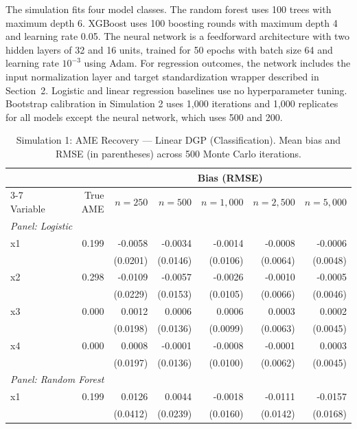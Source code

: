 \documentclass[conference]{IEEEtran}
\begin{document}
	The simulation fits four model classes. The random forest uses 100 trees with maximum depth 6. XGBoost uses 100 boosting rounds with maximum depth 4 and learning rate 0.05. The neural network is a feedforward architecture with two hidden layers of 32 and 16 units, trained for 50 epochs with batch size 64 and learning rate $10^{-3}$ using Adam. For regression outcomes, the network includes the input normalization layer and target standardization wrapper described in Section~2. Logistic and linear regression baselines use no hyperparameter tuning. Bootstrap calibration in Simulation 2 uses 1{,}000 iterations and 1{,}000 replicates for all models except the neural network, which uses 500 and 200.
	
	\begin{table}[htbp]
		\centering
		\small
		\begin{threeparttable}
			\caption{Simulation 1: AME Recovery --- Linear DGP (Classification). Mean bias and RMSE (in parentheses) across 500 Monte Carlo iterations.}
			\label{tab:sim1_classification_linear}
			\begin{tabular}{lrrrrrr}
				\toprule
				& & \multicolumn{5}{c}{Bias (RMSE)} \\
				\cmidrule(lr){3-7}
				Variable & True AME & $n=250$ & $n=500$ & $n=1,000$ & $n=2,500$ & $n=5,000$ \\
				\midrule
				\multicolumn{7}{l}{\textit{Panel: Logistic}} \\
				\quad x1 & 0.199 & -0.0058 & -0.0034 & -0.0014 & -0.0008 & -0.0006 \\
				&  & (0.0201) & (0.0146) & (0.0106) & (0.0064) & (0.0048) \\
				\quad x2 & 0.298 & -0.0109 & -0.0057 & -0.0026 & -0.0010 & -0.0005 \\
				&  & (0.0229) & (0.0153) & (0.0105) & (0.0066) & (0.0046) \\
				\quad x3 & 0.000 & 0.0012 & 0.0006 & 0.0006 & 0.0003 & 0.0002 \\
				&  & (0.0198) & (0.0136) & (0.0099) & (0.0063) & (0.0045) \\
				\quad x4 & 0.000 & 0.0008 & -0.0001 & -0.0008 & -0.0001 & 0.0003 \\
				&  & (0.0197) & (0.0136) & (0.0100) & (0.0062) & (0.0045) \\
				\midrule
				\multicolumn{7}{l}{\textit{Panel: Random Forest}} \\
				\quad x1 & 0.199 & 0.0126 & 0.0044 & -0.0018 & -0.0111 & -0.0157 \\
				&  & (0.0412) & (0.0239) & (0.0160) & (0.0142) & (0.0168) \\

\end{tabular}
\end{threeparttable}
\end{table}
\end{document}
